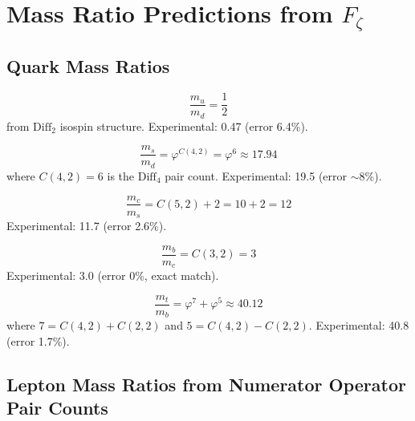 \chapter{Mass Ratio Predictions from \texorpdfstring{$F_\zeta$}{Fζ}}
\label{chap:pd_mass_ratios}

\section{Quark Mass Ratios}
\label{sec:mass_quark}

\begin{theorem}
\label{thm:mass_mu_md}
\leanok
\[
\frac{m_u}{m_d} = \frac{1}{2}
\]
from $\mathrm{Diff}_2$ isospin structure. Experimental: 0.47 (error 6.4\%).
\end{theorem}

\begin{theorem}
\label{thm:mass_ms_md}
\leanok
\[
\frac{m_s}{m_d} = \varphi^{C(4,2)} = \varphi^6 \approx 17.94
\]
where $C(4,2) = 6$ is the $\mathrm{Diff}_4$ pair count. Experimental: 19.5 (error $\sim 8\%$).
\end{theorem}

\begin{theorem}
\label{thm:mass_mc_ms}
\leanok
\[
\frac{m_c}{m_s} = C(5,2) + 2 = 10 + 2 = 12
\]
Experimental: 11.7 (error 2.6\%).
\end{theorem}

\begin{theorem}
\label{thm:mass_mb_mc}
\leanok
\[
\frac{m_b}{m_c} = C(3,2) = 3
\]
Experimental: 3.0 (error 0\%, exact match).
\end{theorem}

\begin{theorem}
\label{thm:mass_mt_mb}
\leanok
\[
\frac{m_t}{m_b} = \varphi^7 + \varphi^5 \approx 40.12
\]
where $7 = C(4,2) + C(2,2)$ and $5 = C(4,2) - C(2,2)$. Experimental: 40.8 (error 1.7\%).
\end{theorem}

\section{Lepton Mass Ratios from Numerator Operator Pair Counts}
\label{sec:mass_lepton}

